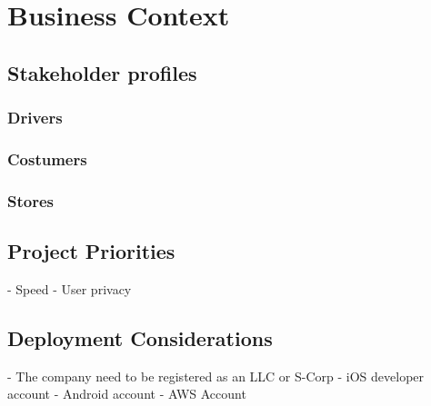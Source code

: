 \section{Business Context}
\subsection{Stakeholder profiles}
\subsubsection{Drivers}
\subsubsection{Costumers}
\subsubsection{Stores}

\subsection{Project Priorities}
- Speed
- User privacy
\subsection{Deployment Considerations}
- The company need to be registered as an LLC or S-Corp
- iOS developer account
- Android account
- AWS Account